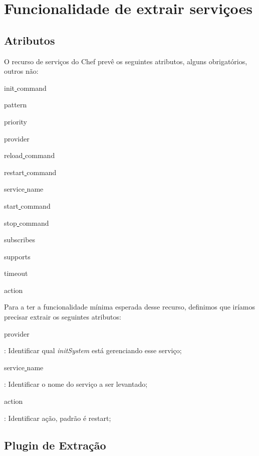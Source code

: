 \section{Funcionalidade de extrair serviçoes}
\label{sec:services}

\subsection{Atributos}

O recurso de serviços do Chef prevê os seguintes atributos, alguns obrigatórios, outros não:

\begin{itemize}
{\itshape\item init\underline{ }command}
{\itshape\item pattern}
{\itshape\item priority}
{\itshape\item provider}
{\itshape\item reload\underline{ }command}
{\itshape\item restart\underline{ }command}
{\itshape\item service\underline{ }name}
{\itshape\item start\underline{ }command}
{\itshape\item stop\underline{ }command}
{\itshape\item subscribes}
{\itshape\item supports}
{\itshape\item timeout}
{\itshape\item action}
\end{itemize}

Para a ter a funcionalidade mínima esperada desse recurso, definimos que iríamos precisar
extrair os seguintes atributos:


\begin{itemize}
    {\itshape\item provider}: Identificar qual \textit{initSystem} está gerenciando
esse serviço;
    {\itshape\item service\underline{ }name}: Identificar o nome do serviço a
ser levantado;
    {\itshape\item action}: Identificar ação, padrão é restart;
\end{itemize}

\subsection{Plugin de Extração}

